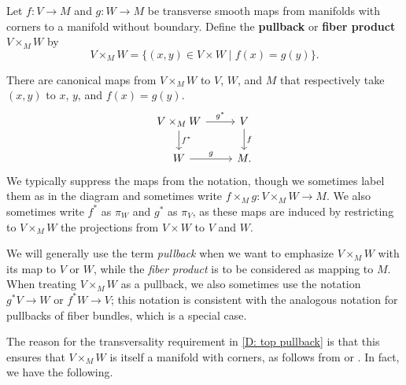 \begin{definition}\label{D: top pullback}
	Let $f \colon V \to M$ and $g \colon W \to M$ be transverse smooth maps from manifolds with corners to a manifold without boundary.
	Define the \textbf{pullback} or \textbf{fiber product} $V \times_M W$ by
	$$V \times _M W = \{(x, y) \in V \times W \mid f(x) = g(y)\}.$$

	There are canonical maps from $V \times _M W$ to $V$, $W$, and $M$ that respectively take $(x,y)$ to $x$, $y$, and $f(x) = g(y)$.
	\[
	\begin{tikzcd}
		V \times_M W \arrow[r, "g^*"] \arrow[d, "f^*"] & V \arrow[d, "f"] \\
		W \arrow[r, "g"] & M.
	\end{tikzcd}
	\]
	We typically suppress the maps from the notation, though we sometimes label them as in the diagram and sometimes write $f \times _M g \colon V \times _M W \to M$.
	We also sometimes write $f^*$ as $\pi_W$ and $g^*$ as $\pi_V$, as these maps are induced by restricting to $V \times _MW$ the projections from $V \times W$ to $V$ and $W$.

	We will generally use the term \textit{pullback} when we want to emphasize $V \times _M W$ with its map to $V$ or $W$, while the \textit{fiber product} is to be considered as mapping to $M$.
	When treating $V \times _M W$ as a pullback, we also sometimes use the notation $g^*V \to W$ or $f^*W \to V$; this notation is consistent with the analogous notation for pullbacks of fiber bundles, which is a special case.
\end{definition}

The reason for the transversality requirement in \cref{D: top pullback} is that this ensures that $V\times_MW$ is itself a manifold with corners, as follows from \cite[Theorem 7.2.7]{MaDo92} or \cite[Theorem 6.4]{Joy12}. In fact, we have the following. 

